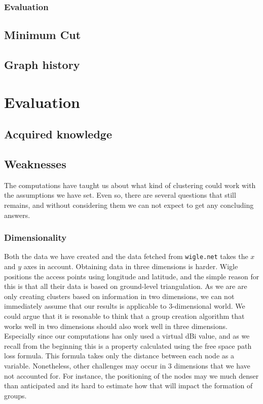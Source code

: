 \subsubsection{Evaluation}

\subsection{Minimum Cut}

\subsection{Graph history}



\section{Evaluation}
\subsection{Acquired knowledge}
\subsection{Weaknesses}
The computations have taught us about what kind of clustering could work with the assumptions we have set. Even so, there are several questions that still remains,
and without considering them we can not expect to get any concluding answers. 

\subsubsection{Dimensionality} 
Both the data we have created and the data fetched from \verb|wigle.net| takes the $x$ and $y$ axes in account. Obtaining data in three dimensions is harder.
Wigle positions the access points using longitude and latitude, and the simple reason for this is that all their data is based on ground-level triangulation.
As we are are only creating clusters based on information in two dimensions, we can not immediately assume that our results is applicable to 3-dimensional world. 
We could argue that it is resonable to think that a group creation algorithm that works well in two dimensions should also work well in three dimensions. Especially since our computations has only
used a virtual dBi value, and as we recall from the beginning this is a property calculated using the free space path loss formula. This formula takes only the distance between each node
as a variable. Nonetheless, other challenges may occur in 3 dimensions that we have not accounted for. For instance, 
the positioning of the nodes may we much denser than anticipated and its hard to estimate how that will impact the formation of groups. 

